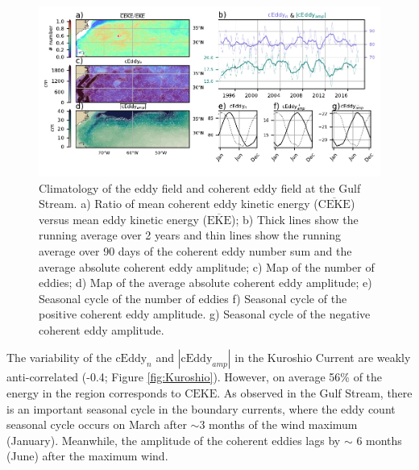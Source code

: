\documentclass[draft,linenumbers]{agujournal2019}
\newcommand{\MEKE}{\overline{\textrm{EKE}}}
\newcommand{\MCEKE}{\overline{\textrm{CEKE}}}
\newcommand{\CEKE}{\textrm{CEKE}}
\newcommand{\cEddy}{\textrm{cEddy}}
\begin{document}
	\begin{figure}
	    \centering
	    \includegraphics[width=1\textwidth]{figures/regional_ratios_and_stats_V3_5.pdf}
	    \caption{Climatology of the eddy field and coherent eddy field at the Gulf Stream. a) Ratio of mean coherent eddy kinetic energy ($\MCEKE$) versus mean eddy kinetic energy ($\MEKE$); b) Thick lines show the running average over 2 years and thin lines show the running average over 90 days of the coherent eddy number sum and the average absolute coherent eddy amplitude; c) Map of the number of eddies; d) Map of the average absolute coherent eddy amplitude; e) Seasonal cycle of the number of eddies f) Seasonal cycle of the positive coherent eddy amplitude. g) Seasonal cycle of the negative coherent eddy amplitude.}
	    \label{fig:Gulf_Stream}
	\end{figure}

	The variability of the $\cEddy_{n}$ and $|\cEddy_{amp}|$ in the Kuroshio Current are weakly anti-correlated (-0.4; Figure \ref{fig:Kuroshio}). 
	However, on average 56\% of the energy in the region corresponds to $\CEKE$.
	As observed in the Gulf Stream, there is an important seasonal cycle in the boundary currents, where the eddy count seasonal cycle occurs on March after $\sim$3 months of the wind maximum (January). Meanwhile, the amplitude of the coherent eddies lags by $\sim$ 6 months (June) after the maximum wind. 
\end{document}
